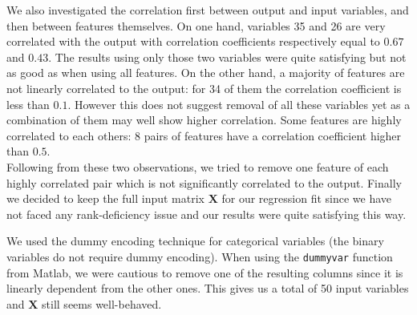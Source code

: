 \documentclass{article} %
\begin{document}
  We also investigated the correlation first between output and input variables, and then between features themselves. On one hand, variables 35 and 26 are very correlated with the output with correlation coefficients respectively equal to $0.67$ and $0.43$. The results using only those two variables were quite satisfying but not as good as when using all features. On the other hand, a majority of features are not linearly correlated to the output: for 34 of them the correlation coefficient is less than $0.1$. However this does not suggest removal of all these variables yet as a combination of them may well show higher correlation. Some features are highly correlated to each others: 8 pairs of features have a correlation coefficient higher than $0.5$.\\
  Following from these two observations, we tried to remove one feature of each highly correlated pair which is not significantly correlated to the output. Finally we decided to keep the full input matrix $\mathbf{X}$ for our regression fit since we have not faced any rank-deficiency issue and our results were quite satisfying this way.

  We used the dummy encoding technique for categorical variables (the binary variables do not require dummy encoding). When using the \texttt{dummyvar} function from Matlab, we were cautious to remove one of the resulting columns since it is linearly dependent from the other ones. This gives us a total of 50 input variables and $\mathbf{X}$ still seems well-behaved.
\end{document}
